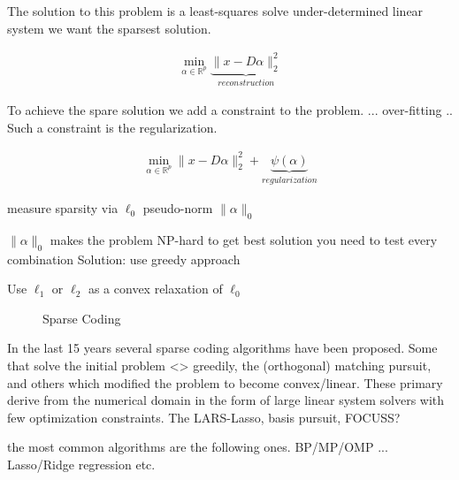 The solution to this problem is a least-squares solve under-determined linear system we want the sparsest solution.


\begin{align}
\min_{\alpha\in\mathbb{R}^{p}} \underbrace{\lVert x - D\alpha \rVert^{2}_{2}}_{reconstruction} \label{eq:problem}
\end{align}

To achieve the spare solution we add a constraint to the problem. ... over-fitting .. Such a constraint is the regularization.

\begin{align}
\min_{\alpha\in\mathbb{R}^{p}} \lVert x - D\alpha \rVert^{2}_{2} + \underbrace{\psi(\alpha)}_{regularization}
\end{align}


measure sparsity via        $\ell_0$ pseudo-norm       $\lVert\alpha\rVert_{0}$


$\lVert\alpha\rVert_{0}$ makes the problem NP-hard
to get best solution you need to test every combination
Solution:
use greedy approach 


Use $\ell_1$ or $\ell_2$ as a convex relaxation of $\ell_0$


\begin{figure}
\centering
\caption{Sparse Coding}
\label{fig:da_x}
\end{figure}


In the last 15 years several sparse coding algorithms have been proposed. 
Some that solve the initial problem <> greedily, the (orthogonal) matching pursuit, and others which modified the problem to become convex/linear. These primary derive from the numerical domain in the form of 
large linear system solvers with few optimization constraints. The LARS-Lasso, basis pursuit, FOCUSS?

the most common algorithms are the following ones.
BP/MP/OMP ...
Lasso/Ridge regression etc.




